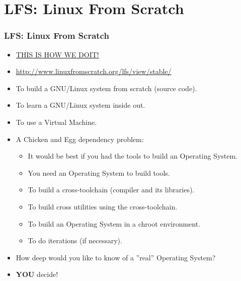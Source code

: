 \documentclass[aspectratio=169, xcolor=table, notheorems, hyperref={pdfpagelabels=false}]{beamer}
\begin{document}
\section{LFS: Linux From Scratch}
\begin{frame}
\frametitle{LFS: Linux From Scratch}
\begin{itemize}
\item \href{https://youtu.be/jEoM3qan9Gs}{THIS IS HOW WE DOIT!}
\item \url{http://www.linuxfromscratch.org/lfs/view/stable/}
\item To build a GNU/Linux system from scratch (source code).
\item To learn a GNU/Linux system inside out.
\item To use a Virtual Machine.
\item A Chicken and Egg dependency problem:
\begin{itemize}
\item It would be best if you had the tools to build an Operating System.
\item You need an Operating System to build tools.
\item To build a cross-toolchain (compiler and its libraries).
\item To build cross utilities using the cross-toolchain.
\item To build an Operating System in a chroot environment.
\item To do iterations (if necessary).
\end{itemize}
\item How deep would you like to know of a ''real'' Operating System?
\item \textbf{YOU} decide!
\end{itemize}
\end{frame}

\end{document}

